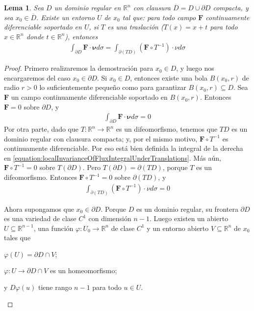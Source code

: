 \documentclass{report}
\newcommand{\realNumbers}{\mathbb{R}}
\newtheorem{lemma}{Lema}
\theoremstyle{definition}
\theoremstyle{remark}
\begin{document}
  \begin{lemma}
    Sea \(D\) un dominio regular en \(\realNumbers^n\) con clausura \(\overline{D} = D \cup \partial D\) compacta, y sea \(x_0 \in \overline{D}\).
    Existe un entorno \(U\) de \(x_0\) tal que:
    para todo campo \(\mathbf{F}\) continuamente diferenciable soportado en \(U\), si \(T\) es una traslación (\(T(x) = x + t\) para todo \(x \in \realNumbers^n\) donde \(t \in \realNumbers^n\)), entonces
    \begin{align}
      \label{equation:localInvarianceOfFluxIntegralUnderTranslations}
      \int_{\partial D} \mathbf{F} \cdot \mathbf{\nu} d \sigma
      =
      \int_{\partial (T D)} (\mathbf{F} \circ T^{- 1}) \cdot \nu d \sigma
    \end{align}
  \end{lemma}
  \begin{proof}
    Primero realizaremos la demostración para \(x_0 \in D\), y luego nos encargaremos del caso \(x_0 \in \partial D\).
    Si \(x_0 \in D\), entonces existe una bola \(B(x_0, r)\) de radio \(r > 0\) lo suficientemente pequeño como para garantizar \(B(x_0, r) \subseteq D\).
    Sea \(\mathbf{F}\) un campo continuamente diferenciable soportado en \(B(x_0, r)\).
    Entonces \(\mathbf{F} = 0\) sobre \(\partial D\), y 
    \begin{align}
      \int_{\partial D} \mathbf{F} \cdot \mathbf{\nu} d \sigma
      =
      0
    \end{align}
    Por otra parte, dado que \(T : \realNumbers^n \rightarrow \realNumbers^n\) es un difeomorfismo, tenemos que \(T D\) es un dominio regular con clausura compacta;
    y, por el mismo motivo, \(\mathbf{F} \circ T^{- 1}\) es continuamente diferenciable.
    Por eso está bien definida la integral de la derecha en \eqref{equation:localInvarianceOfFluxIntegralUnderTranslations}.
    Más aún, \(\mathbf{F} \circ T^{- 1} = 0\) sobre \(T(\partial D)\).
    Pero \(T(\partial D) = \partial(T D)\), porque \(T\) es un difeomorfismo.
    Entonces \(\mathbf{F} \circ T^{- 1} = 0\) sobre \(\partial (T D)\), y 
    \begin{align}
      \int_{\partial (T D)} (\mathbf{F} \circ T^{- 1}) \cdot \nu d \sigma
      =
      0
    \end{align}

    Ahora supongamos que \(x_0 \in \partial D\).
    Porque \(D\) es un dominio regular, su frontera \(\partial D\) es una variedad de clase \(C^1\) con dimensión \(n - 1\).
    Luego existen un abierto \(U \subseteq \realNumbers^{n - 1}\), una función \(\varphi : U_0 \rightarrow \realNumbers^n\) de clase \(C^1\) y un entorno abierto \(V \subseteq \realNumbers^n\) de \(x_0\) tales que 
    \begin{enumerate*}
      \item \(\varphi(U) = \partial D \cap V\);
      \item \(\varphi : U \rightarrow \partial D \cap V\) es un homeomorfismo;
      \item y \(D \varphi (u)\) tiene rango \(n - 1\) para todo \(u \in U\).
    \end{enumerate*}



\end{proof}
\end{document}
